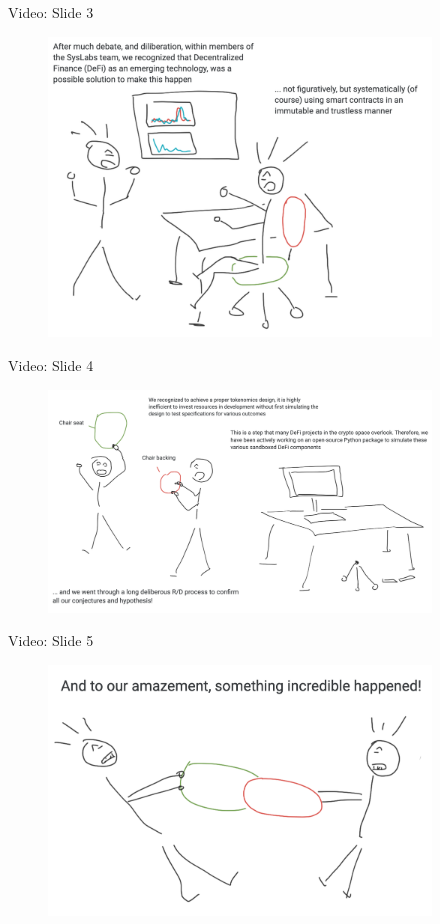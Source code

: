 \documentclass[10pt,xcolor=svgnames]{beamer} %
\begin{document}
\begin{frame}{Video: Slide 3}
\begin{figure}[h!]
\includegraphics[width=4in]{img/slide3.png}
\label{fig:dex_forest}
\end{figure}
\end{frame}

\begin{frame}{Video: Slide 4}
\begin{figure}[h!]
\includegraphics[width=4in]{img/slide4.png}
\label{fig:dex_forest}
\end{figure}
\end{frame}

\begin{frame}{Video: Slide 5}
\begin{figure}[h!]
\includegraphics[width=4in]{img/slide5.png}
\label{fig:dex_forest}
\end{figure}
\end{frame}
\end{document}

